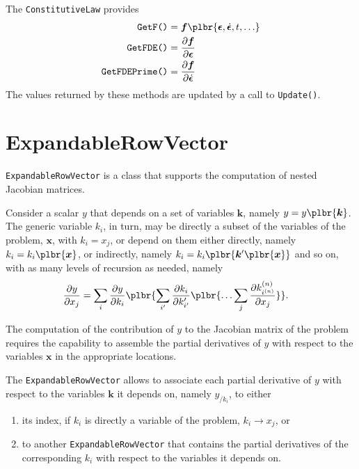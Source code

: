 \documentclass[10pt,fleqn,subeqn]{report}
\newcommand{\T}[1]{\bm{#1}}
\begin{document}
The \texttt{ConstitutiveLaw} provides
\begin{subequations}
\begin{align}
	\texttt{GetF()}
	&=
	\T{f}\plbr{ \T{\epsilon}, \dot{\T{\epsilon}}, t, \ldots }
	\\
	\texttt{GetFDE()}
	&=
	\frac{\partial \T{f}}{\partial \T{\epsilon}}
	\\
	\texttt{GetFDEPrime()}
	&=
	\frac{\partial \T{f}}{\partial \dot{\T{\epsilon}}}
\end{align}
\end{subequations}
The values returned by these methods are updated by a call to
\texttt{Update()}.



\section{ExpandableRowVector}
\texttt{ExpandableRowVector} is a class that supports
the computation of nested Jacobian matrices.

Consider a scalar $y$  that depends on a set of variables $\T{k}$,
namely $y=y\plbr{\T{k}}$.
The generic variable $k_i$, in turn, may be directly a subset of the variables
of the problem, $\T{x}$, with $k_i=x_j$, or depend on them either directly,
namely $k_i=k_i\plbr{\T{x}}$, or indirectly,
namely $k_i=k_i\plbr{\T{k}'\plbr{\T{x}}}$ and so on,
with as many levels of recursion as needed, namely
\begin{align}
	\frac{\partial y}{\partial x_j}
	&=
	\sum_{i} \frac{\partial y}{\partial k_i}\plbr{
		\sum_{i'} \frac{\partial k_i}{\partial k'_{i'}}\plbr{
			\ldots
			\sum_{j} \frac{\partial k^{(n)}_{i^{(n)}}}{\partial x_j}
		}
	}
	.
\end{align}

The computation of the contribution of $y$ to the Jacobian matrix
of the problem requires the capability to assemble the partial derivatives
of $y$ with respect to the variables $\T{x}$ in the appropriate locations.

The \texttt{ExpandableRowVector} allows to associate each partial derivative
of $y$ with respect to the variables $\T{k}$ it depends on, namely $y_{/k_i}$,
to either 
\begin{enumerate}
\renewcommand{\labelenumi}{\alph{enumi})}
\item its index, if $k_i$ is directly a variable of the problem,
$k_i\rightarrow x_j$, or
\item to another \texttt{ExpandableRowVector} that contains
the partial derivatives of the corresponding $k_i$ with respect
to the variables it depends on.
\end{enumerate}
\end{document}
